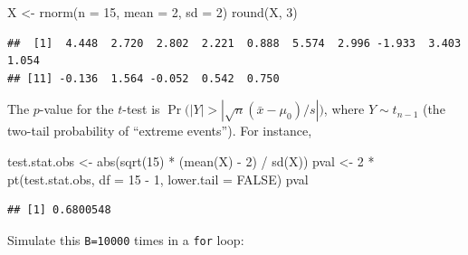 \documentclass[
]{book}
\newenvironment{Shaded}{\begin{snugshade}}{\end{snugshade}}
\newcommand{\AttributeTok}[1]{\textcolor[rgb]{0.77,0.63,0.00}{#1}}
\newcommand{\ConstantTok}[1]{\textcolor[rgb]{0.00,0.00,0.00}{#1}}
\newcommand{\DecValTok}[1]{\textcolor[rgb]{0.00,0.00,0.81}{#1}}
\newcommand{\FunctionTok}[1]{\textcolor[rgb]{0.00,0.00,0.00}{#1}}
\newcommand{\NormalTok}[1]{#1}
\newcommand{\OtherTok}[1]{\textcolor[rgb]{0.56,0.35,0.01}{#1}}
\newcommand{\SpecialCharTok}[1]{\textcolor[rgb]{0.00,0.00,0.00}{#1}}
\theoremstyle{definition}
\theoremstyle{definition}
\theoremstyle{definition}
\theoremstyle{definition}
\theoremstyle{remark}
\begin{document}
\begin{Shaded}
\begin{Highlighting}[]
\NormalTok{X }\OtherTok{\textless{}{-}} \FunctionTok{rnorm}\NormalTok{(}\AttributeTok{n =} \DecValTok{15}\NormalTok{, }\AttributeTok{mean =} \DecValTok{2}\NormalTok{, }\AttributeTok{sd =} \DecValTok{2}\NormalTok{)}
\FunctionTok{round}\NormalTok{(X, }\DecValTok{3}\NormalTok{)}
\end{Highlighting}
\end{Shaded}

\begin{verbatim}
##  [1]  4.448  2.720  2.802  2.221  0.888  5.574  2.996 -1.933  3.403  1.054
## [11] -0.136  1.564 -0.052  0.542  0.750
\end{verbatim}

The \(p\)-value for the \(t\)-test is \(\Pr\big(|Y|> |\sqrt n(\bar x - \mu_0)/s|\big)\), where \(Y\sim t_{n-1}\) (the two-tail probability of ``extreme events''). For instance,

\begin{Shaded}
\begin{Highlighting}[]
\NormalTok{test.stat.obs }\OtherTok{\textless{}{-}} \FunctionTok{abs}\NormalTok{(}\FunctionTok{sqrt}\NormalTok{(}\DecValTok{15}\NormalTok{) }\SpecialCharTok{*}\NormalTok{ (}\FunctionTok{mean}\NormalTok{(X) }\SpecialCharTok{{-}} \DecValTok{2}\NormalTok{) }\SpecialCharTok{/} \FunctionTok{sd}\NormalTok{(X))}
\NormalTok{pval }\OtherTok{\textless{}{-}} \DecValTok{2} \SpecialCharTok{*} \FunctionTok{pt}\NormalTok{(test.stat.obs, }\AttributeTok{df =} \DecValTok{15} \SpecialCharTok{{-}} \DecValTok{1}\NormalTok{, }\AttributeTok{lower.tail =} \ConstantTok{FALSE}\NormalTok{)}
\NormalTok{pval}
\end{Highlighting}
\end{Shaded}

\begin{verbatim}
## [1] 0.6800548
\end{verbatim}

Simulate this \texttt{B=10000} times in a \texttt{for} loop:
\end{document}
